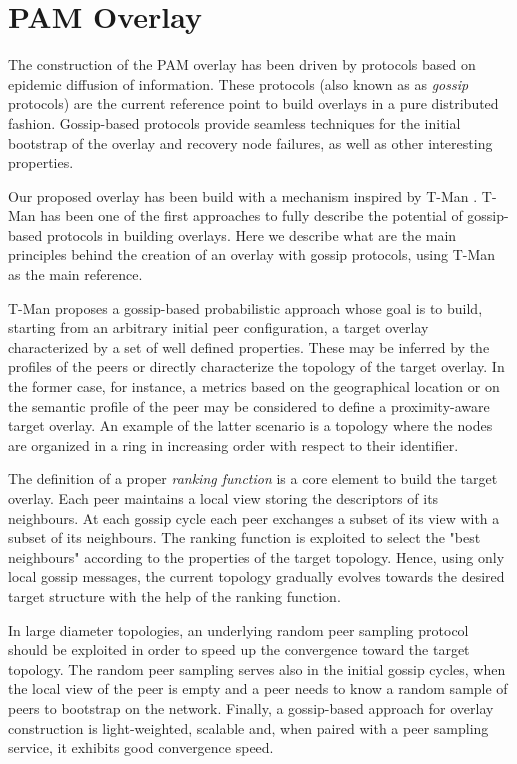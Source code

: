 \documentclass[final,10pt,a5paper]{phdimt}
\theoremstyle{definition}
\begin{document}
\section{PAM Overlay}

The construction of the PAM overlay has been driven by protocols based on epidemic diffusion of information.
These protocols (also known as as \textit{gossip} protocols) are the current reference point to build overlays in a pure distributed fashion. Gossip-based protocols provide seamless techniques for the initial bootstrap of the overlay and recovery node failures, as well as other interesting properties.

Our proposed overlay has been build with a mechanism inspired by T-Man \cite{Jelasity2008}.
T-Man has been one of the first approaches to fully describe the potential of gossip-based protocols in building overlays. 
Here we describe what are the main principles behind the creation of an overlay with gossip protocols, using T-Man as the main reference.

T-Man proposes a gossip-based probabilistic approach whose goal is to build, starting from an arbitrary initial peer configuration, a target overlay characterized by a set of well defined properties. 
These may be inferred by the profiles of the peers or directly characterize the topology of the target overlay. 
In the former case, for instance, a metrics based on the geographical location or on the semantic profile of the peer may be considered to define a  proximity-aware target overlay. An example of the latter scenario is a topology where the nodes are organized in a ring in increasing order with respect to their identifier. 

The definition of a proper {\em ranking function} is a core element to build the target overlay.
Each peer maintains a local view storing the descriptors of its neighbours. At each gossip cycle each peer exchanges a subset of its view with a subset of its neighbours. The ranking function is exploited to select the "best neighbours" according to the properties of the target topology. Hence, using only local gossip messages, the current topology gradually evolves towards the desired target structure with the help of the ranking function.

In large diameter topologies, an underlying random peer
sampling protocol should be exploited in order to speed up the convergence  toward the target topology. The random peer sampling 
serves also in the initial gossip cycles, when the local view of
the peer is empty and a peer needs to know a random sample of
peers to bootstrap on the network. 
Finally, a gossip-based approach for overlay construction is light-weighted, scalable and, when paired with a peer sampling service, it exhibits good convergence speed.
\end{document}
